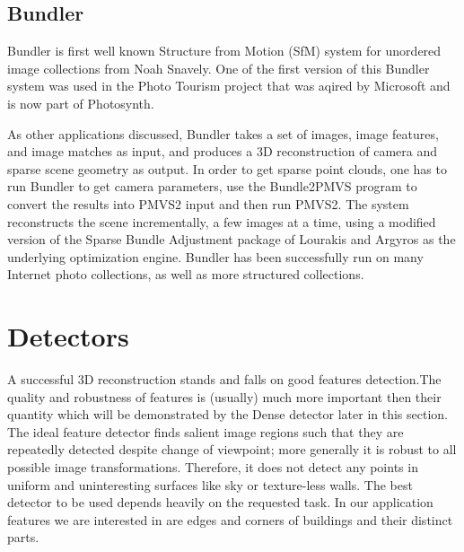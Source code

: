 \subsection*{Bundler}
Bundler is first well known Structure from Motion (SfM) system for unordered image collections from Noah Snavely. One of the first version of this Bundler system was used in the Photo Tourism project that was aqired by Microsoft and is now part of Photosynth. 

As other applications discussed, Bundler takes a set of images, image features, and image matches as input, and produces a 3D reconstruction of camera and sparse scene geometry as output. In order to get sparse point clouds, one has to run Bundler to get camera parameters, use the Bundle2PMVS program to convert the results into PMVS2 input and then run PMVS2. The system reconstructs the scene incrementally, a few images at a time, using a modified version of the Sparse Bundle Adjustment package of Lourakis and Argyros as the underlying optimization engine. Bundler has been successfully run on many Internet photo collections, as well as more structured collections. \cite{www:bundler}

\section{Detectors}
\label{sec:detectors}
A successful 3D reconstruction stands and falls on good features detection.The quality and robustness of features is (usually) much more important then their quantity which will be demonstrated by the Dense detector later in this section. The ideal feature detector finds salient image regions such that they are repeatedly detected despite change of viewpoint; more generally it is robust to all possible image transformations. Therefore, it does not detect any points in uniform and uninteresting surfaces like sky or texture-less walls. The best detector to be used depends heavily on the requested task. In our application features we are interested in are edges and corners of buildings and their distinct parts.

